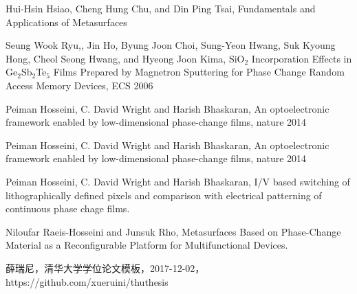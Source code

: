 \begin{thebibliography}{99}
 Hui-Hsin Hsiao, Cheng Hung Chu, and Din Ping Tsai, Fundamentals and Applications of Metasurfaces

 Seung Wook Ryu,, Jin Ho, Byung Joon Choi, Sung-Yeon Hwang, Suk Kyoung Hong, Cheol Seong Hwang, and Hyeong Joon Kima, SiO$_{2}$ Incorporation Effects in Ge$_{2}$Sb$_{2}$Te$_{5}$ Films Prepared
by Magnetron Sputtering for Phase Change Random Access Memory Devices, ECS 2006

 Peiman Hosseini, C. David Wright and Harish Bhaskaran, An optoelectronic framework enabled by low-dimensional phase-change films, nature 2014

 Peiman Hosseini, C. David Wright and Harish Bhaskaran, An optoelectronic framework enabled by low-dimensional phase-change films, nature 2014

 Peiman Hosseini, C. David Wright and Harish Bhaskaran, I/V based switching of lithographically defined pixels and comparison with electrical patterning of continuous phase chage films.

 Niloufar Raeis-Hosseini and Junsuk Rho, Metasurfaces Based on Phase-Change Material as a Reconfigurable Platform for Multifunctional Devices.

 薛瑞尼，清华大学学位论文模板，2017-12-02， https://github.com/xueruini/thuthesis

\end{thebibliography}